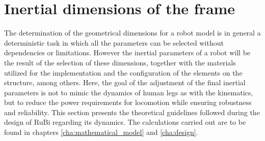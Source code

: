 
\section{Inertial dimensions of the frame} %
\label{sec:physical_properties}
The determination of the geometrical dimensions for a robot model is in general a deterministic task in which all the parameters can be selected without dependencies or limitations.
However the inertial parameters of a robot will be the result of the selection of these dimensions, together with the materials utilized for the implementation and the configuration of the elements on the structure, among others.
Here, the goal of the adjustment of the final inertial parameters is not to mimic the dynamics of human legs as with the kinematics, but to reduce the power requirements for locomotion while ensuring robustness and reliability.
This section presents the theoretical guidelines followed during the design of RuBi regarding its dynamics.
The calculations carried out are to be found in chapters \ref{cha:mathematical_model} and \ref{cha:design}. 



